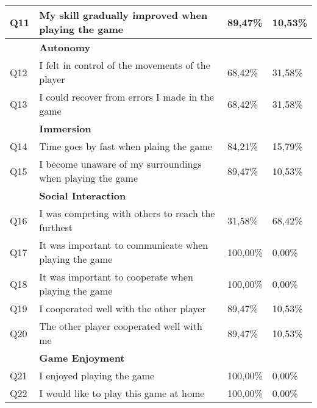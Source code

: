\begin{table}[]
\begin{tabularx}{\textwidth}{|l|X|l|l|}
		Q11         & My skill gradually improved when playing the game              & 89,47\%        & 10,53\%           \\ \hline
		\textbf{}   & \textbf{Autonomy}                                              & \textbf{}      & \textbf{}         \\ \hline
		Q12         & I felt in control of the movements of the player               & 68,42\%        & 31,58\%           \\ \hline
		Q13         & I could recover from errors I made in the game                 & 68,42\%        & 31,58\%           \\ \hline
		\textbf{}   & \textbf{Immersion}                                             & \textbf{}      & \textbf{}         \\ \hline
		Q14         & Time goes by fast when plaing the game                         & 84,21\%        & 15,79\%           \\ \hline
		Q15         & I become unaware of my surroundings when playing the game      & 89,47\%        & 10,53\%           \\ \hline
		\textbf{}   & \textbf{Social Interaction}                                    & \textbf{}      & \textbf{}         \\ \hline
		Q16         & I was competing with others to reach the furthest              & 31,58\%        & 68,42\%           \\ \hline
		Q17         & It was important to communicate when playing the game          & 100,00\%       & 0,00\%            \\ \hline
		Q18         & It was important to cooperate when playing the game            & 100,00\%       & 0,00\%            \\ \hline
		Q19         & I cooperated well with the other player                        & 89,47\%        & 10,53\%           \\ \hline
		Q20         & The other player cooperated well with me                       & 89,47\%        & 10,53\%           \\ \hline
		\textbf{}   & \textbf{Game Enjoyment}                                        & \textbf{}      & \textbf{}         \\ \hline
		Q21         & I enjoyed playing the game                                     & 100,00\%       & 0,00\%            \\ \hline
		Q22         & I would like to play this game at home                         & 100,00\%       & 0,00\%            \\ \hline
	\end{tabularx}
\end{table}


